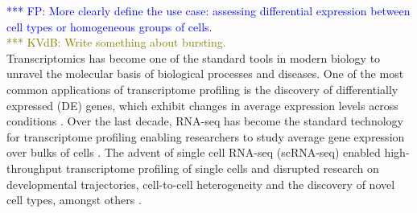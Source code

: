 \documentclass{bmcart}
\newcommand{\fanny}[1]{\textcolor{blue}{*** FP: #1}}
\newcommand{\koen}[1]{\textcolor{olive}{*** KVdB: #1}}
\begin{document}
\fanny{More clearly define the use case: assessing differential expression between cell types or homogeneous groups of cells.}\\
\koen{Write something about bursting.}\\
Transcriptomics has become one of the standard tools in modern biology to unravel the molecular basis of biological processes and diseases. One of the most common applications of transcriptome profiling is the discovery of differentially expressed (DE) genes, which exhibit changes in average expression levels across conditions \cite{Love2014, Robinson2010a, Law2014}. Over the last decade, RNA-seq has become the standard technology for transcriptome profiling enabling researchers to study average gene expression over bulks of cells \cite{Wang2009, Goodwin2016}.  The advent of single cell RNA-seq (scRNA-seq) enabled high-throughput transcriptome profiling of single cells and disrupted research on developmental trajectories, cell-to-cell heterogeneity and the discovery of novel cell types, amongst others \cite{Lonnberg2017, Buettner2015, Patel2014, Kolodziejczyk2015, Li2017, Usoskin2014}.
 
\end{document}
